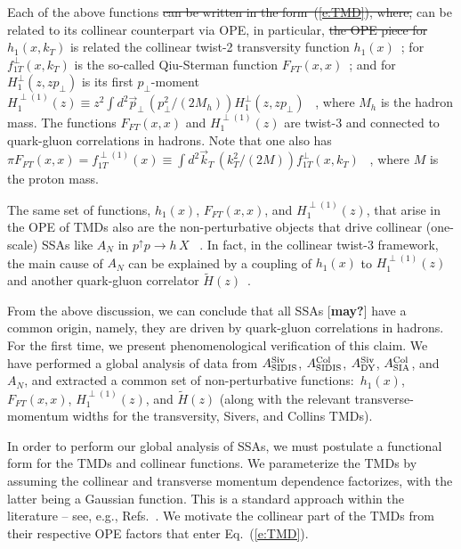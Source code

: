\documentclass[twocolumn,prl,aps,superscriptaddress
               ,footinbib,amsfonts,amsmath,amssymb,showpacs]{revtex4-1}
\newcommand{\com}[1]{{\color{red} [\textbf{#1}]}}
\newcommand{\old}[1]{{\color{red}\sout{#1}}}
\newcommand{\new}[1]{{\color{blue}#1}}
\begin{document}
Each of the above functions \old{can be written in the form~(\ref{e:TMD}),
where,} can be related to its collinear counterpart via OPE, in particular, \old{the OPE piece for} $h_1(x,k_T)$ is \new{related} the collinear
twist-2 transversity function $h_1(x)$~\cite{Bacchetta:2013pqa}; for
$f_{1T}^\perp(x,k_T)$ is the so-called Qiu-Sterman function
$F_{FT}(x,x)$~\cite{Aybat:2011ge}; and for $H_{1}^\perp(z,zp_\perp)$
is its first $p_{\perp}$-moment 
$
H_1^{\perp(1)}(z) 
    \equiv z^2\int d^2 \vec{p}_\perp\,(p_\perp^2/(2M_h))
    H_{1}^\perp(z,zp_\perp)
$
~\cite{Kang:2015msa}, where $M_h$ is the
hadron mass.
%
The functions $F_{FT}(x,x)$ and $H_1^{\perp(1)}(z)$ are
twist-3 and connected to quark-gluon correlations in hadrons.  Note
that one also has 
$
\pi F_{FT}(x,x)=f_{1T}^{\perp(1)}(x)
                \equiv \int d^2 \vec{k}_T\,(k_T^2/(2M)) 
                                f_{1T}^\perp(x,k_T)
$
~\cite{Boer:2003cm}, where $M$ is the proton mass.

The same set of functions, $h_1(x)$, $F_{FT}(x,x)$, and
$H_1^{\perp(1)}(z)$, that arise in the OPE of TMDs also are the
non-perturbative objects that drive collinear (one-scale) SSAs like
$A_N$ in $p^\uparrow p\to h\,X$
~\cite{Qiu:1998ia, Kouvaris:2006zy, Koike:2009ge, Metz:2012ct, Beppu:2013uda}.
%
In fact, in the collinear twist-3 framework, the main cause of $A_N$
can be explained by a coupling of $h_1(x)$ to $H_1^{\perp(1)}(z)$ and
another quark-gluon correlator
$\tilde{H}(z)$~\cite{Kanazawa:2014dca,Gamberg:2017gle}.

From the above discussion, we can conclude that all SSAs \com{may?} 
have a common origin, namely, they are driven by quark-gluon
correlations in hadrons.  
%
For the first time, we present phenomenological verification
of this claim.  We have performed a global analysis of data from
$A_{\rm SIDIS}^{\rm Siv}$, $A_{\rm SIDIS}^{\rm Col}$, $A_{\rm DY}^{\rm
Siv}$, $A_{\rm SIA}^{\rm Col}$, and $A_N$, and extracted a common set
of non-perturbative functions:~$h_1(x)$, $F_{FT}(x,x)$,
$H_1^{\perp(1)}(z)$, and $\tilde{H}(z)$ (along with the relevant
transverse-momentum widths for the transversity, Sivers, and Collins
TMDs).

\vspace{0.1cm}
%
In order to perform our global analysis of SSAs, we must postulate a
functional form for the TMDs and collinear functions.
%
We parameterize the TMDs by assuming the collinear and transverse
momentum dependence factorizes, with the latter being a Gaussian
function.  
%
This is a standard approach within the literature -- see, e.g.,
Refs.~\cite{Anselmino:2007fs,Anselmino:2008jk,Anselmino:2013vqa}.  
%
We motivate the collinear part of the TMDs from their respective OPE
factors that enter Eq.~(\ref{e:TMD}).  
\end{document}
